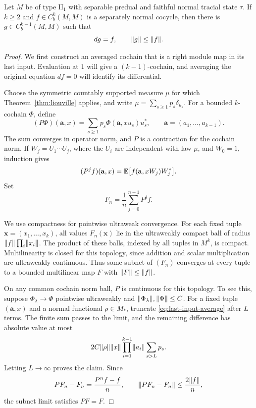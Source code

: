 \begin{proposition}\label{prop:separable-primitive}
Let $M$ be of type $\mathrm{II}_1$ with separable predual and faithful
normal tracial state $\tau$.  If $k\ge2$ and
$f\in C_b^k(M,M)$ is a separately normal cocycle, then there is
$g\in C_b^{k-1}(M,M)$ such that
\begin{equation}\label{eq:separable-primitive-bound}
 dg=f,\qquad \lVert g\rVert\le\lVert f\rVert.
\end{equation}
\end{proposition}

\begin{proof}
We first construct an averaged cochain that is a right module map in
its last input.  Evaluation at $1$ will give a $(k-1)$-cochain, and averaging
the original equation $df=0$ will identify its differential.

Choose the symmetric countably supported measure $\mu$ for which
Theorem~\ref{thm:liouville} applies, and write
$\mu=\sum_{s\ge1}p_s\delta_{u_s}$.  For a bounded $k$-cochain
$\Phi$, define
\begin{equation}\label{eq:last-input-average}
 (P\Phi)(\mathbf a,x)
 =\sum_{s\ge1}p_s\Phi(\mathbf a,xu_s)u_s^*,
 \qquad \mathbf a=(a_1,\ldots,a_{k-1}).
\end{equation}
The sum converges in operator norm, and $P$ is a contraction for the
cochain norm.  If $W_j=U_1\cdots U_j$, where the $U_i$ are independent
with law $\mu$, and $W_0=1$, induction gives
\[
 (P^j f)(\mathbf a,x)
 =\mathbb E\bigl[f(\mathbf a,xW_j)W_j^*\bigr].
\]
Set
\[
 F_n=\frac1n\sum_{j=0}^{n-1}P^j f.
\]

We use compactness for pointwise ultraweak convergence.  For each fixed
tuple $\mathbf x=(x_1,\ldots,x_k)$, all values $F_n(\mathbf x)$ lie
in the ultraweakly compact ball of radius
$\lVert f\rVert\prod_i\lVert x_i\rVert$.  The product of these balls, indexed by
all tuples in $M^k$, is compact.  Multilinearity is closed for this
topology, since addition and scalar multiplication are ultraweakly
continuous.  Thus some subnet of $(F_n)$ converges at every tuple to
a bounded multilinear map $F$ with $\lVert F\rVert\le\lVert f\rVert$.

On any common cochain norm ball, $P$ is continuous for this topology.
To see this, suppose $\Phi_\lambda\to\Phi$ pointwise ultraweakly and
$\lVert\Phi_\lambda\rVert,\lVert\Phi\rVert\le C$.  For a fixed tuple
$(\mathbf a,x)$ and a normal functional $\rho\in M_*$, truncate
\eqref{eq:last-input-average} after $L$ terms.  The finite sum passes
to the limit, and the remaining difference has absolute value at most
\[
 2C\lVert\rho\rVert\lVert x\rVert
 \prod_{i=1}^{k-1}\lVert a_i\rVert\sum_{s>L}p_s.
\]
Letting $L\to\infty$ proves the claim.  Since
\[
 PF_n-F_n=\frac{P^nf-f}{n},\qquad
 \lVert PF_n-F_n\rVert\le\frac{2\lVert f\rVert}n,
\]
the subnet limit satisfies $PF=F$.


\end{proof}
